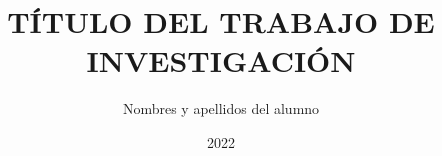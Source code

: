 \documentclass[a4paper,12pt,oneside]{tesisutec}
\begin{document}
\frontmatter


\title{TÍTULO DEL TRABAJO DE INVESTIGACIÓN}

\author{Nombres y apellidos del alumno } %

\date{2022}

\maketitle






\tableofcontents

\newpage

\listoftables

\newpage

\listoffigures


\mainmatter
\pagestyle{fancy}


 







\renewcommand{\bibname}{\hfill\Large\bf{REFERENCIAS BIBLIOGRÁFICAS}\hfill}




\end{document}
